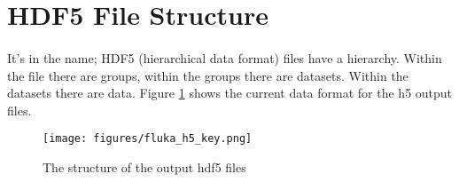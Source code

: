 \section{HDF5 File Structure}

\paragraph{}
It's in the name; HDF5 (hierarchical data format) files have a hierarchy. Within the file there are groups, within the groups there are datasets. Within the datasets there are data. Figure \ref{fig:h5_file} shows the current data format for the h5 output files.

\begin{figure}[h]
    \begin{center}
    \texttt{[image: figures/fluka\_h5\_key.png]}
    \caption{The structure of the output hdf5 files}
    \label{fig:h5_file}
    \end{center}
\end{figure}